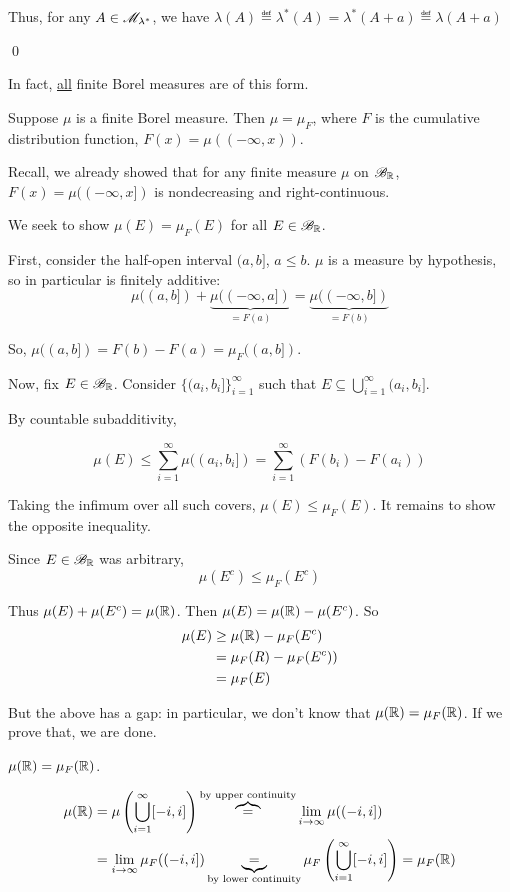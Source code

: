 \documentclass[x11names,reqno,14pt]{extarticle}
\newcommand*{\oo}{\infty}
\newcommand{\seq}[1]{_{#1 = 1}^\oo}
\begin{document}
Thus, for any $A \in \mathscr{M}_{\lambda^*}$, we have $\lambda(A) \eqdef \lambda^*(A) = \lambda^*(A + a) \eqdef \lambda(A + a)$

\qed

In fact, \underline{all} finite Borel measures are of this form.
\thm

Suppose $\mu$ is a finite Borel measure. Then $\mu = \mu_F$, where $F$ is the cumulative distribution function, $F(x) = \mu((-\oo, x))$. 

\proof

Recall, we already showed that for any finite measure $\mu$ on $\mathscr{B}_{\mathbb{R}}$, $F(x) = \mu((-\oo, x])$ is nondecreasing and right-continuous. 

We seek to show $\mu(E) = \mu_F(E)$ for all $E \in \mathscr{B}_{\mathbb{R}}$. 

First, consider the half-open interval $(a, b]$, $a \leq b$. $\mu$ is a measure by hypothesis, so in particular is finitely additive: 
\[
\mu((a, b]) + \underbrace{\mu((-\oo, a])}_{=F(a)} = \underbrace{\mu((-\oo, b])}_{=F(b)}
\]

So, $\mu((a, b]) = F(b) - F(a) = \mu_F((a, b])$.

Now, fix $E\in \mathscr{B}_{\mathbb{R}}$. Consider $\{(a_i, b_i]\}\seq{i}$ such that $E \subseteq\bigcup\seq{i}(a_i, b_i]$. 

By countable subadditivity, 

\[
\mu(E)  \leq\sum\seq{i}\mu((a_i, b_i]) = \sum\seq{i}(F(b_i) - F(a_i)) 
\]

Taking the infimum over all such covers, $\mu(E) \leq \mu_F(E)$. It remains to show the opposite inequality.

Since $E\in\mathscr{B}_{\mathbb{R}}$ was arbitrary, 
\[
\mu(E^c)\leq \mu_F(E^c)
\]

Thus $\mu(E) + \mu(E^c) = \mu(\mathbb{R})$. Then $\mu(E) =\mu(\mathbb{R}) - \mu(E^c)$. So 
\begin{align*}
\mu(E) & \geq \mu(\mathbb{R}) - \mu_F(E^c) \\
& = \mu_F(R) - \mu_F(E^c)) \\
& = \mu_F(E) \\
\end{align*}

But the above has a gap: in particular, we don't know that $\mu(\mathbb{R}) = \mu_F(\mathbb{R})$. If we prove that, we are done. 

\claim 

$\mu(\mathbb{R}) = \mu_F(\mathbb{R})$. 

\proof

\begin{align*}
\mu(\R) & = \mu\left(\bigcup\seq{i}[-i, i]\right) \overbrace{=}^{\text{by upper continuity}} \lim_{i\to\oo}\mu((-i, i]) \\
		  & = \lim_{i\to\oo}\mu_F((-i, i]) \underbrace{=}_{\text{by lower continuity}} \mu_F\left(\bigcup\seq{i}[-i, i]\right) = \mu_F(\R) \\
\end{align*}
\end{document}
